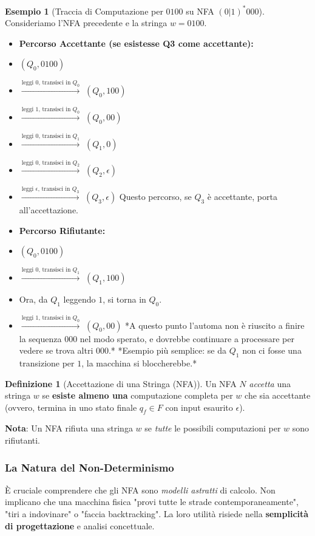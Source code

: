 \documentclass[a4paper]{article}
\theoremstyle{definition} %
\newtheorem{definition}{Definizione}[section]
\newtheorem{example}{Esempio}[section]
\begin{document}
\begin{example}[Traccia di Computazione per $0100$ su NFA $(0|1)^*000$]
Consideriamo l'NFA precedente e la stringa $w = 0100$.
\begin{itemize}
    \item \textbf{Percorso Accettante (se esistesse Q3 come accettante):}
    \item $(Q_0, 0100)$
    \item $\xrightarrow{\text{leggi 0, transisci in } Q_0}$ $(Q_0, 100)$
    \item $\xrightarrow{\text{leggi 1, transisci in } Q_0}$ $(Q_0, 00)$
    \item $\xrightarrow{\text{leggi 0, transisci in } Q_1}$ $(Q_1, 0)$
    \item $\xrightarrow{\text{leggi 0, transisci in } Q_2}$ $(Q_2, \epsilon)$
    \item $\xrightarrow{\text{leggi } \epsilon \text{, transisci in } Q_3}$ $(Q_3, \epsilon)$
    Questo percorso, se $Q_3$ è accettante, porta all'accettazione.

    \item \textbf{Percorso Rifiutante:}
    \item $(Q_0, 0100)$
    \item $\xrightarrow{\text{leggi 0, transisci in } Q_1}$ $(Q_1, 100)$
    \item Ora, da $Q_1$ leggendo $1$, si torna in $Q_0$.
    \item $\xrightarrow{\text{leggi 1, transisci in } Q_0}$ $(Q_0, 00)$
    *A questo punto l'automa non è riuscito a finire la sequenza $000$ nel modo sperato, e dovrebbe continuare a processare per vedere se trova altri $000$.*
    *Esempio più semplice: se da $Q_1$ non ci fosse una transizione per $1$, la macchina si bloccherebbe.*
\end{itemize}
\end{example}

\begin{definition}[Accettazione di una Stringa (NFA)]
Un NFA $N$ \emph{accetta} una stringa $w$ se \textbf{esiste almeno una} computazione completa per $w$ che sia accettante (ovvero, termina in uno stato finale $q_f \in F$ con input esaurito $\epsilon$).
\end{definition}
\noindent \textbf{Nota}: Un NFA rifiuta una stringa $w$ se \emph{tutte} le possibili computazioni per $w$ sono rifiutanti.

\subsubsection{La Natura del Non-Determinismo}
È cruciale comprendere che gli NFA sono \emph{modelli astratti} di calcolo. Non implicano che una macchina fisica "provi tutte le strade contemporaneamente", "tiri a indovinare" o "faccia backtracking". La loro utilità risiede nella \textbf{semplicità di progettazione} e analisi concettuale.
\end{document}
